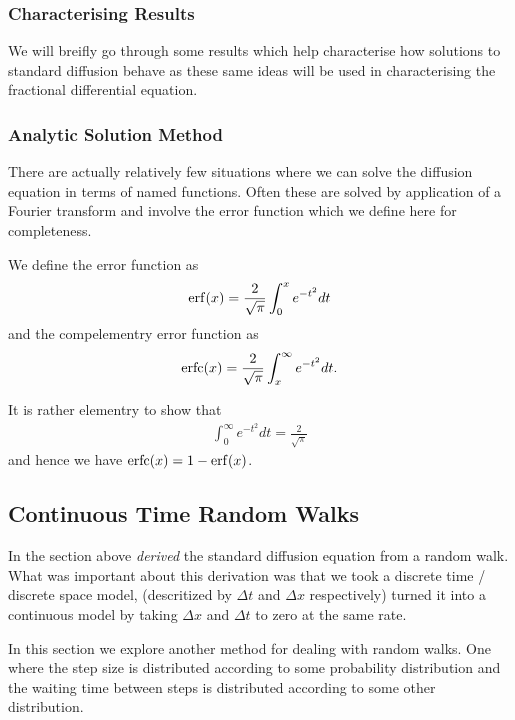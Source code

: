 \subsubsection{Characterising Results}

We will breifly go through some results which help characterise how solutions to standard diffusion behave as these same ideas will be used in characterising the fractional differential equation.

\subsubsection{Analytic Solution Method}

There are actually relatively few situations where we can solve the diffusion equation in terms of named functions. Often these are solved by application of a Fourier transform and involve the error function which we define here for completeness.

\begin{definition}
    We define the error function as
    \begin{align}
        \operatorname{erf}(x) = \frac{2}{\sqrt{\pi}} \int_0^x e^{-t^2} dt
    \end{align}
    and the compelementry error function as
    \begin{align}
        \operatorname{erfc}(x) = \frac{2}{\sqrt{\pi}} \int_x^\infty e^{-t^2} dt.
    \end{align}
\end{definition}
It is rather elementry to show that
\begin{align}
    \int_0^\infty e^{-t^2} dt = \frac{2}{\sqrt{\pi}}
\end{align}
and hence we have $ \operatorname{erfc}(x) = 1 - \operatorname{erf}(x) $.

\subsection{Continuous Time Random Walks}
In the section above \emph{derived} the standard diffusion equation from a random walk. What was important about this derivation was that we took a discrete time / discrete space model, (descritized by $ \Delta t $ and $ \Delta x $ respectively) turned it into a continuous model by taking $ \Delta x $ and $ \Delta t $ to zero at the same rate. 

In this section we explore another method for dealing with random walks. One where the step size is distributed according to some probability distribution and the waiting time between steps is distributed according to some other distribution.

